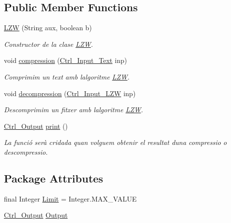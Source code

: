 \subsection*{Public Member Functions}
\begin{DoxyCompactItemize}
\item 
\hyperlink{classdomini_1_1algorithm_1_1LZW_a00bd43f0691ac9679e6232b701e535ec}{L\+ZW} (String aux, boolean b)
\begin{DoxyCompactList}\small\item\em Constructor de la clase \hyperlink{classdomini_1_1algorithm_1_1LZW}{L\+ZW}. \end{DoxyCompactList}\item 
void \hyperlink{classdomini_1_1algorithm_1_1LZW_a79ce338289c3e8fcdd111ca029cfb45b}{compression} (\hyperlink{classpersistencia_1_1input_1_1Ctrl__Input__Text}{Ctrl\+\_\+\+Input\+\_\+\+Text} inp)
\begin{DoxyCompactList}\small\item\em Comprimim un text amb l\textquotesingle{}algoritme \hyperlink{classdomini_1_1algorithm_1_1LZW}{L\+ZW}. \end{DoxyCompactList}\item 
void \hyperlink{classdomini_1_1algorithm_1_1LZW_a1c7f66a62ed475a72a49f294c41f54fa}{decompression} (\hyperlink{classpersistencia_1_1input_1_1Ctrl__Input__LZW}{Ctrl\+\_\+\+Input\+\_\+\+L\+ZW} inp)
\begin{DoxyCompactList}\small\item\em Descomprimim un fitxer amb l\textquotesingle{}algoritme \hyperlink{classdomini_1_1algorithm_1_1LZW}{L\+ZW}. \end{DoxyCompactList}\item 
\hyperlink{classpersistencia_1_1output_1_1Ctrl__Output}{Ctrl\+\_\+\+Output} \hyperlink{classdomini_1_1algorithm_1_1LZW_a57ba5129e7f26d4cc066195e3d6c9c8c}{print} ()
\begin{DoxyCompactList}\small\item\em La funció serà cridada quan volguem obtenir el resultat d\textquotesingle{}una compressio o descompressio. \end{DoxyCompactList}\end{DoxyCompactItemize}
\subsection*{Package Attributes}
\begin{DoxyCompactItemize}
\item 
final Integer \hyperlink{classdomini_1_1algorithm_1_1LZW_a6d83dbcda4939db767fa0522d40fcc0a}{Limit} = Integer.\+M\+A\+X\+\_\+\+V\+A\+L\+UE
\item 
\hyperlink{classpersistencia_1_1output_1_1Ctrl__Output}{Ctrl\+\_\+\+Output} \hyperlink{classdomini_1_1algorithm_1_1LZW_a22cd522a89b5226a3fb3424ffe122f72}{Output}
\end{DoxyCompactItemize}


